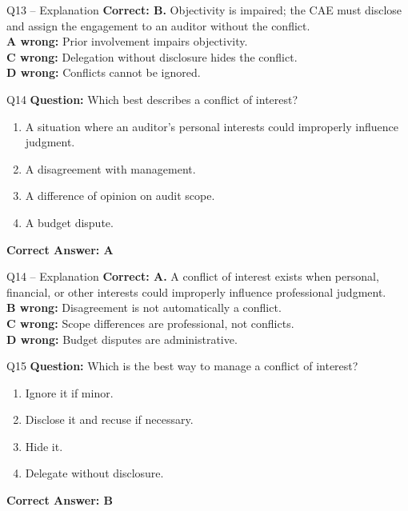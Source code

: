 \documentclass[aspectratio=169,10pt]{beamer}
\begin{document}
	\begin{frame}[t]{Q13 -- Explanation}
		\small
		\textbf{Correct: B.} Objectivity is impaired; the CAE must disclose and assign the engagement to an auditor without the conflict. \\[4pt]
		\textbf{A wrong:} Prior involvement impairs objectivity. \\[2pt]
		\textbf{C wrong:} Delegation without disclosure hides the conflict. \\[2pt]
		\textbf{D wrong:} Conflicts cannot be ignored.
	\end{frame}
	
	\begin{frame}[t]{Q14}
		\small
		\textbf{Question:} Which best describes a conflict of interest?
		\begin{enumerate}[label=\Alph*.,itemsep=1pt,topsep=2pt]
			\item A situation where an auditor's personal interests could improperly influence judgment.
			\item A disagreement with management.
			\item A difference of opinion on audit scope.
			\item A budget dispute.
		\end{enumerate}
		\vspace{4pt}
		\textbf{Correct Answer: A}
	\end{frame}
	
	\begin{frame}[t]{Q14 -- Explanation}
		\small
		\textbf{Correct: A.} A conflict of interest exists when personal, financial, or other interests could improperly influence professional judgment. \\[4pt]
		\textbf{B wrong:} Disagreement is not automatically a conflict. \\[2pt]
		\textbf{C wrong:} Scope differences are professional, not conflicts. \\[2pt]
		\textbf{D wrong:} Budget disputes are administrative.
	\end{frame}
	
	\begin{frame}[t]{Q15}
		\small
		\textbf{Question:} Which is the best way to manage a conflict of interest?
		\begin{enumerate}[label=\Alph*.,itemsep=1pt,topsep=2pt]
			\item Ignore it if minor.
			\item Disclose it and recuse if necessary.
			\item Hide it.
			\item Delegate without disclosure.
		\end{enumerate}
		\vspace{4pt}
		\textbf{Correct Answer: B}
	\end{frame}
	
\end{document}
